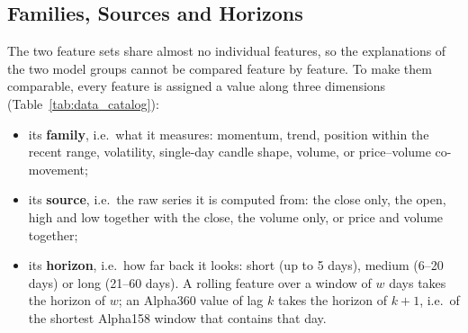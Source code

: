 \subsection{Families, Sources and Horizons}
\label{sec:data_catalog}

The two feature sets share almost no individual features, so the explanations of the two model groups cannot be compared feature by feature. To make them comparable, every feature is assigned a value along three dimensions (Table~\ref{tab:data_catalog}):
\begin{itemize}[noitemsep]
    \item its \textbf{family}, i.e.\ what it measures: momentum, trend, position within the recent range, volatility, single-day candle shape, volume, or price--volume co-movement;
    \item its \textbf{source}, i.e.\ the raw series it is computed from: the close only, the open, high and low together with the close, the volume only, or price and volume together;
    \item its \textbf{horizon}, i.e.\ how far back it looks: short (up to 5 days), medium (6--20 days) or long (21--60 days). A rolling feature over a window of $w$ days takes the horizon of $w$; an Alpha360 value of lag $k$ takes the horizon of $k + 1$, i.e.\ of the shortest Alpha158 window that contains that day.
\end{itemize}

